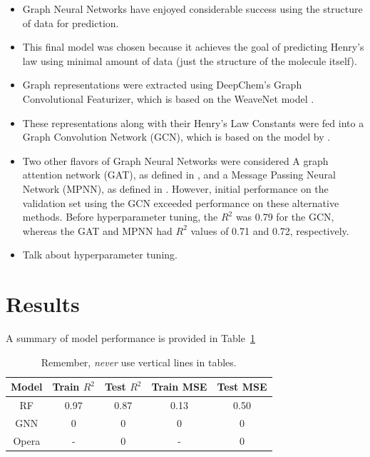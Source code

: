 \documentclass[12pt, oneside]{article}   	%
\begin{document}
\begin{itemize}
	\item Graph Neural Networks have enjoyed considerable success using the structure of data for prediction.
	\item This final model was chosen because it achieves the goal of predicting Henry's law using minimal amount of data (just the structure of the molecule itself). 
	\item Graph representations were extracted using DeepChem's Graph Convolutional Featurizer, which is based on the WeaveNet model \cite{Kearnes2016}. 
	\item These representations along with their Henry's Law Constants were fed into a Graph Convolution Network (GCN), which is based on the model by \cite{Kipf2016}.
	\item Two other flavors of Graph Neural Networks were considered\: A graph attention network (GAT), as defined in \cite{Velickovic2017}, and a Message Passing Neural Network (MPNN), as defined in \cite{Gilmer2017}. However, initial performance on the validation set using the GCN exceeded performance on these alternative methods. Before hyperparameter tuning, the $R^2$ was 0.79 for the GCN, whereas the GAT and MPNN had $R^2$ values of 0.71 and 0.72, respectively.
	\item Talk about hyperparameter tuning.
\end{itemize}

\section{Results}
A summary of model performance is provided in Table~\ref{}

\begin{table}[htbp]
   \centering
   \begin{tabular}{c c c c c} %
      \toprule

      Model    & Train $R^2$ & Test $R^2$ & Train MSE & Test MSE \\
      \midrule
      RF    & 0.97 & 0.87 & 0.13 & 0.50 \\
      GNN & 0 & 0 & 0 & 0 \\
      Opera & - & 0 & - & 0 \\
      \bottomrule
   \end{tabular}
   \caption{Remember, \emph{never} use vertical lines in tables.}
   \label{tab:booktabs}
\end{table}
\end{document}
